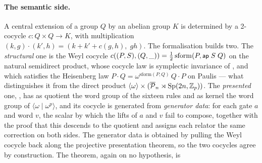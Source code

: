 \paragraph{The semantic side.}  A central extension of a group $Q$ by
an abelian group $K$ is determined by a 2-cocycle $c : Q \times Q \to
K$, with multiplication $(k, g)\cdot(k', h) = (k + k' + c(g,h),\; gh)$.
The formalisation builds two.  The \emph{structural} one is the Weyl
cocycle $c((P,S),(Q,\_)) = \tfrac12\,\mathrm{sform}(P, \mbox{\textsf{\small ap}}\;S\;Q)$
on the natural semidirect product, whose cocycle law is symplectic
invariance of , and which
satisfies the Heisenberg law $P \cdot Q = \omega^{\mathrm{sform}(P,Q)}
\, Q \cdot P$ on Paulis --- what distinguishes it from the direct product
$\langle\omega\rangle \times (\overline{\mathcal{P}}_{n} \rtimes \mathrm{Sp}(2n,\mathbb{Z}_p))$.  The
\emph{presented} one, , has as quotient the word
group of the sixteen rules and as kernel the word group of
$\langle\omega \mid \omega^{p}\rangle$, and its cocycle is generated
from \emph{generator data}: for each gate $a$ and word $v$, the scalar
by which the lifts of $a$ and $v$ fail to compose, together with the
proof that this descends to the quotient and assigns each relator the
same correction on both sides.  The generator data is obtained by pulling
the Weyl cocycle back along the projective presentation theorem, so the
two cocycles agree by construction.  The theorem, again on no hypothesis,
is

\begingroup\renewcommand{\AgdaCodeStyle}{\footnotesize}
\begin{code}%
\>[0]\AgdaSpace{}%
\AgdaSymbol{:}\AgdaSpace{}%
\AgdaSpace{}%
\AgdaSpace{}%
\AgdaSpace{}%
\AgdaSymbol{(}\AgdaSpace{}%
\AgdaSymbol{)}\AgdaSpace{}%
\AgdaSpace{}%
\AgdaSymbol{(}\AgdaSpace{}%
\AgdaSpace{}%
\AgdaSymbol{(}\AgdaSpace{}%
\AgdaSymbol{))}\<%
\end{code}
\endgroup
\begin{code}[hide]%
\>[0]\AgdaSpace{}%
\AgdaSymbol{=}\AgdaSpace{}%
\<%
\end{code}

